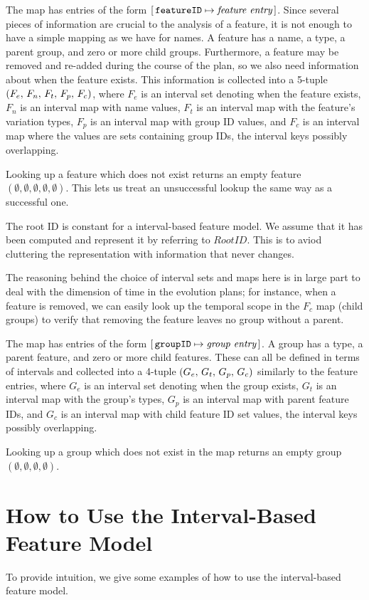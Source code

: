 The \features{} map has entries of the form $[ \,\texttt{featureID} \mapsto \textit{feature entry}\, ]$. Since several pieces of information are crucial to the analysis of a feature, it is not enough to have a simple mapping as we have for names.
A feature has a name, a type, a parent group, and zero or more child groups. Furthermore, a feature may be removed and re-added during the course of the plan, so we also need information about when the feature exists.
This information is collected into a 5-tuple $\left(F_e,\, F_n,\, F_t,\, F_p,\, F_c\right)$, where $F_e$ is an interval set denoting when the feature exists, $F_n$ is an interval map with name values, $F_t$ is an interval map with the feature's variation types, $F_p$ is an interval map with group ID values, and $F_c$ is an interval map where the values are sets containing group IDs, the interval keys possibly overlapping.

Looking up a feature which does not exist returns an empty feature $(\emptyset \comma \emptyset \comma \emptyset \comma \emptyset \comma \emptyset)$. This lets us treat an unsuccessful lookup the same way as a successful one.

The root ID is constant for a interval-based feature model. We assume that it has been computed and represent it by referring to $RootID$. This is to aviod cluttering the representation with information that never changes.

The reasoning behind the choice of interval sets and maps here is in large part to deal with the dimension of time in the evolution plans; for instance, when a feature is removed, we can easily look up the temporal scope in the $F_c$ map (child groups) to verify that removing the feature leaves no group without a parent.

The \groups{} map has entries of the form $[ \,\texttt{groupID} \mapsto \textit{group entry}\, ]$. A group has a type, a parent feature, and zero or more child features. These can all be defined in terms of intervals and collected into a 4-tuple $\left(G_e,\, G_t,\, G_p,\, G_c\right)$ similarly to the feature entries, where $G_e$ is an interval set denoting when the group exists, $G_t$ is an interval map with the group's types, $G_p$ is an interval map with parent feature IDs, and $G_c$ is an interval map with child feature ID set values, the interval keys possibly overlapping.

Looking up a group which does not exist in the map returns an empty group $(\emptyset \comma \emptyset \comma \emptyset \comma \emptyset)$. 

\section{How to Use the Interval-Based Feature Model}
\label{sec:how-to-use-the-interval-based-feature-model}
To provide intuition, we give some examples of how to use the interval-based feature model.

